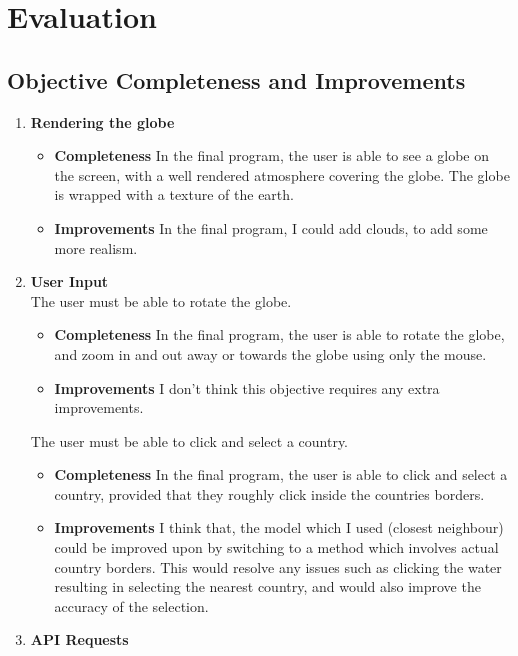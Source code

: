 \chapter{Evaluation}
\section{Objective Completeness and Improvements}
\begin{enumerate}
    \item \textbf{Rendering the globe}
        \begin{itemize}
            \item \textbf{Completeness}
                In the final program, the user is able to see a globe on the screen, with a well rendered atmosphere covering the globe. The globe is wrapped with a texture of the earth.
            \item \textbf{Improvements}
                In the final program, I could add clouds, to add some more realism.
        \end{itemize}
    \item \textbf{User Input} \\
        The user must be able to rotate the globe.
        \begin{itemize}
            \item \textbf{Completeness}
                In the final program, the user is able to rotate the globe, and zoom in and out away or towards the globe using only the mouse.
            \item \textbf{Improvements}
                I don't think this objective requires any extra improvements.
        \end{itemize}
        The user must be able to click and select a country.
        \begin{itemize}
            \item \textbf{Completeness}
                In the final program, the user is able to click and select a country, provided that they roughly click inside the countries borders.
            \item \textbf{Improvements}
                I think that, the model which I used (closest neighbour) could be improved upon by switching to a method which involves actual country borders. This would resolve any issues such as clicking the water resulting in selecting the nearest country, and would also improve the accuracy of the selection.
        \end{itemize}
    \item \textbf{API Requests} \\

\end{enumerate}
